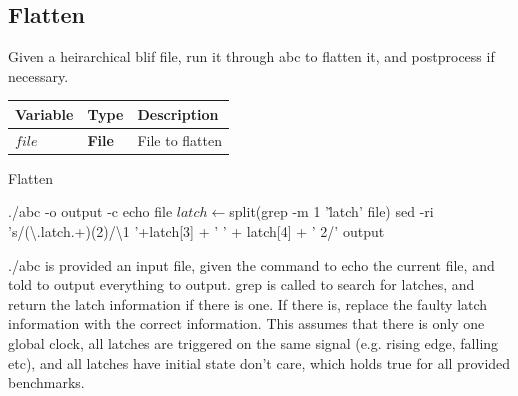 \documentclass[12pt,final,oneside]{article} %
\begin{document}
\subsection{Flatten}
Given a heirarchical blif file, run it through abc to flatten it, and postprocess if necessary.
\begin{algorithm}
    \begin{center}
        \begin{tabularx}{\linewidth}{llX}
        \toprule
        Variable & Type & Description\\
        \midrule
        $file$ &\bf  File & File to flatten\\
        \bottomrule
        \end{tabularx}
    \end{center}
   \caption{Flatten}\label{Flatten}
   \begin{algorithmic}[1]
         \State ./abc -o output -c echo file
         \State $latch \gets $split(grep -m 1 '\.latch' file)
            \State sed -ri 's/(\textbackslash.latch.+)(2)/\textbackslash1 '+latch[3] + ' ' + latch[4] + ' 2/' output
         \EndIf
      \EndProcedure
   \end{algorithmic}
\end{algorithm}

./abc is provided an input file, given the command to echo the current file,
and told to output everything to output.
grep is called to search for latches, and return the latch information if
there is one. If there is, replace the faulty latch information with the
correct information.
This assumes that there is only one global clock, all latches are triggered on
the same signal (e.g. rising edge, falling etc), and all latches have initial
state don't care, which holds true for all provided benchmarks.
\end{document}
